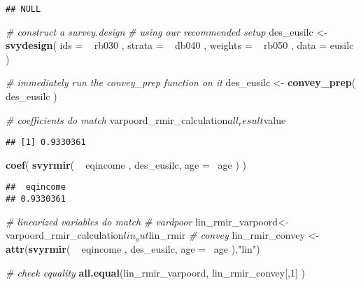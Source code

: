 \documentclass[]{book}
\newenvironment{Shaded}{\begin{snugshade}}{\end{snugshade}}
\newcommand{\KeywordTok}[1]{\textcolor[rgb]{0.13,0.29,0.53}{\textbf{{#1}}}}
\newcommand{\DataTypeTok}[1]{\textcolor[rgb]{0.13,0.29,0.53}{{#1}}}
\newcommand{\DecValTok}[1]{\textcolor[rgb]{0.00,0.00,0.81}{{#1}}}
\newcommand{\StringTok}[1]{\textcolor[rgb]{0.31,0.60,0.02}{{#1}}}
\newcommand{\CommentTok}[1]{\textcolor[rgb]{0.56,0.35,0.01}{\textit{{#1}}}}
\newcommand{\NormalTok}[1]{{#1}}
\theoremstyle{definition}
\theoremstyle{definition}
\theoremstyle{remark}
\begin{document}
\begin{verbatim}
## NULL
\end{verbatim}

\begin{Shaded}
\begin{Highlighting}[]
\CommentTok{# construct a survey.design}
\CommentTok{# using our recommended setup}
\NormalTok{des_eusilc <-}\StringTok{ }
\StringTok{    }\KeywordTok{svydesign}\NormalTok{( }
        \DataTypeTok{ids =} \NormalTok{~}\StringTok{ }\NormalTok{rb030 , }
        \DataTypeTok{strata =} \NormalTok{~}\StringTok{ }\NormalTok{db040 ,  }
        \DataTypeTok{weights =} \NormalTok{~}\StringTok{ }\NormalTok{rb050 , }
        \DataTypeTok{data =} \NormalTok{eusilc}
    \NormalTok{)}

\CommentTok{# immediately run the convey_prep function on it}
\NormalTok{des_eusilc <-}\StringTok{ }\KeywordTok{convey_prep}\NormalTok{( des_eusilc )}

\CommentTok{# coefficients do match}
\NormalTok{varpoord_rmir_calculation$all_result$value}
\end{Highlighting}
\end{Shaded}

\begin{verbatim}
## [1] 0.9330361
\end{verbatim}

\begin{Shaded}
\begin{Highlighting}[]
\KeywordTok{coef}\NormalTok{( }\KeywordTok{svyrmir}\NormalTok{( ~}\StringTok{ }\NormalTok{eqincome , des_eusilc, }\DataTypeTok{age =} \NormalTok{~age ) ) }
\end{Highlighting}
\end{Shaded}

\begin{verbatim}
##  eqincome 
## 0.9330361
\end{verbatim}

\begin{Shaded}
\begin{Highlighting}[]
\CommentTok{# linearized variables do match}
\CommentTok{# vardpoor}
\NormalTok{lin_rmir_varpoord<-}\StringTok{ }\NormalTok{varpoord_rmir_calculation$lin_out$lin_rmir}
\CommentTok{# convey }
\NormalTok{lin_rmir_convey <-}\StringTok{ }\KeywordTok{attr}\NormalTok{(}\KeywordTok{svyrmir}\NormalTok{( ~}\StringTok{ }\NormalTok{eqincome , des_eusilc, }\DataTypeTok{age =} \NormalTok{~age ),}\StringTok{"lin"}\NormalTok{)}

\CommentTok{# check equality}
\KeywordTok{all.equal}\NormalTok{(lin_rmir_varpoord, lin_rmir_convey[,}\DecValTok{1}\NormalTok{] )}
\end{Highlighting}
\end{Shaded}
\end{document}

